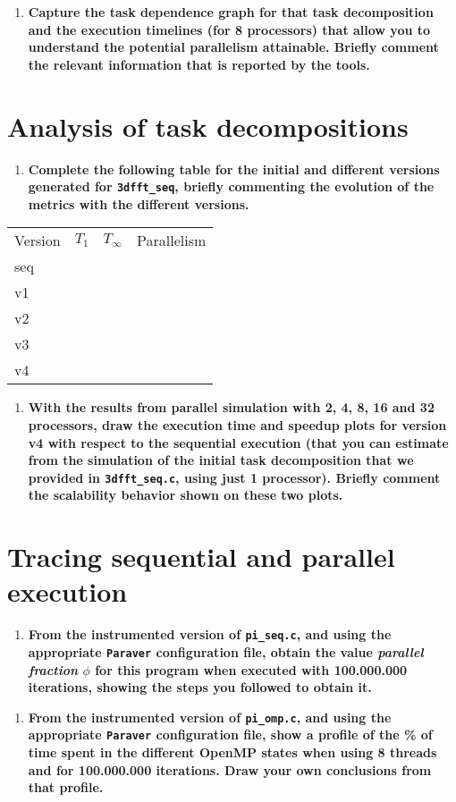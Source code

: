 \documentclass[a4paper]{article}
\begin{document}
\begin{enumerate}[resume]
	\item \textbf{Capture the task dependence graph for that task decomposition and the execution timelines (for 8 processors) that allow you to understand the potential parallelism attainable. Briefly comment the relevant information that is reported by the tools.}
\end{enumerate}

\section*{Analysis of task decompositions}

\begin{enumerate}[resume]
	\item \textbf{Complete the following table for the initial and different versions generated for \texttt{3dfft\_seq}, briefly commenting the evolution of the metrics with the different versions.}
\end{enumerate}

\begin{tabular}{l|rrr}
	Version & $T_1$ & $T_{\infty}$ & Parallelism \\
	seq & & & \\
	v1 & & & \\
	v2 & & & \\
	v3 & & & \\
	v4 & & & 
\end{tabular}

\begin{enumerate}[resume]
	\item \textbf{With the results from parallel simulation with 2, 4, 8, 16 and 32 processors, draw the execution time and speedup plots for version v4 with respect to the sequential execution (that you can estimate from the simulation of the initial task decomposition that we provided in \texttt{3dfft\_seq.c}, using just 1 processor). Briefly comment the scalability behavior shown on these two plots.}
\end{enumerate}

\section*{Tracing sequential and parallel execution}

\begin{enumerate}[resume]
	\item \textbf{From the instrumented version of \texttt{pi\_seq.c}, and using the appropriate \texttt{Paraver} configuration file, obtain the value \textit{parallel fraction} $\phi$ for this program when executed with 100.000.000 iterations, showing the steps you followed to obtain it.}
\end{enumerate}

\begin{enumerate}[resume]
	\item \textbf{From the instrumented version of \texttt{pi\_omp.c}, and using the appropriate \texttt{Paraver} configuration file, show a profile of the \% of time spent in the different OpenMP states when using 8 threads and for 100.000.000 iterations. Draw your own conclusions from that profile.}
\end{enumerate}
\end{document}
